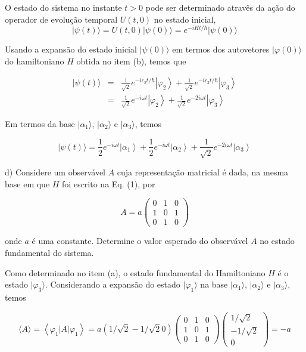 \begin{enumerate}[start=1,label={\bfseries Q\arabic*.}]
{\color{red}

O estado do sistema no instante $t > 0$ pode ser determinado atravês da ação do operador de evolução temporal $U(t,0)$ no estado inicial,
$$
|\psi(t)\rangle= U(t, 0)|\psi(0)\rangle= e^{-i H t / \hbar}|\psi(0)\rangle
$$

Usando a expansão do estado inicial $|\psi(0)\rangle$ em termos dos autovetores $|\varphi(0)\rangle$ do hamiltoniano $H$ obtida no item (b), temos que

\begin{eqnarray*}
|\psi(t)\rangle &=&\frac{1}{\sqrt{2}} e^{-i \epsilon_{2} t / \hbar}\left|\varphi_{2}\right\rangle+\frac{1}{\sqrt{2}} e^{-i \epsilon_{3} t / \hbar}\left|\varphi_{3}\right\rangle \\
&=&\frac{1}{\sqrt{2}} e^{-i \omega t}\left|\varphi_{2}\right\rangle+\frac{1}{\sqrt{2}} e^{-2 i \omega t}\left|\varphi_{3}\right\rangle
\end{eqnarray*}

Em termos da base $| \alpha_{1} \rangle$, $| \alpha_{2} \rangle$ e $| \alpha_{3} \rangle$, temos

$$
|\psi(t)\rangle=\frac{1}{2} e^{-i \omega t}\left|\alpha_{1}\right\rangle+\frac{1}{2} e^{-i \omega t}\left|\alpha_{2}\right\rangle+\frac{1}{\sqrt{2}} e^{-2 i \omega t}\left|\alpha_{3}\right\rangle
$$

}



d) Considere um observável $A$ cuja representação matricial é dada, na mesma base em que $H$ foi escrito na Eq. (1), por

\[ A = a \left( \begin{array}{ccc}
0 & 1 & 0 \\
1 & 0 & 1 \\
0 & 1 & 0 \end{array} \right)\]

onde $a$ é uma constante. Determine o valor esperado do observável $A$ no estado fundamental do sistema.

{\color{red}

Como determinado no item (a), o estado fundamental do Hamiltoniano $H$ é o estado $| \varphi_{3} \rangle$. Considerando a expansão do estado $| \varphi_{1} \rangle$ na base $| \alpha_{1} \rangle$, $| \alpha_{2} \rangle$ e $| \alpha_{3} \rangle$, temos

$$
\langle A\rangle=\left\langle\varphi_{1}|A| \varphi_{1}\right\rangle= a(1 / \sqrt{2}-1 / \sqrt{2} 0)\left(\begin{array}{ccc}
{0} & {1} & {0} \\
{1} & {0} & {1} \\
{0} & {1} & {0}
\end{array}\right)\left(\begin{array}{c}
{1 / \sqrt{2}} \\
{-1 / \sqrt{2}} \\
{0}
\end{array}\right)=-a
$$

}
\end{enumerate}
